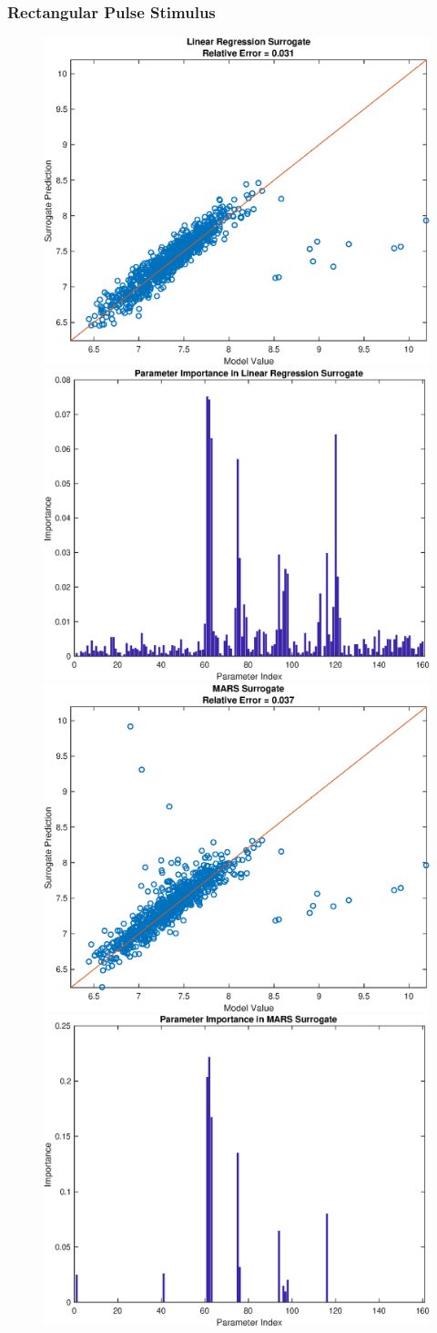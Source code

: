\documentclass[12pt]{article}
\numberwithin{equation}{section}
\begin{document}
\subsubsection{Rectangular Pulse Stimulus}

\begin{figure}[h]
\centering
\includegraphics[width=.49 \textwidth]{Figures/K_ECS_Max_QoI_LR_Prediction_Rectangular.eps}
\includegraphics[width=.49 \textwidth]{Figures/K_ECS_Max_QoI_LR_VI_Rectangular.eps}\\
\includegraphics[width=.49 \textwidth]{Figures/K_ECS_Max_QoI_MARS_Prediction_Rectangular.eps}
\includegraphics[width=.49 \textwidth]{Figures/K_ECS_Max_QoI_MARS_VI_Rectangular.eps}
\end{figure}
\end{document}
